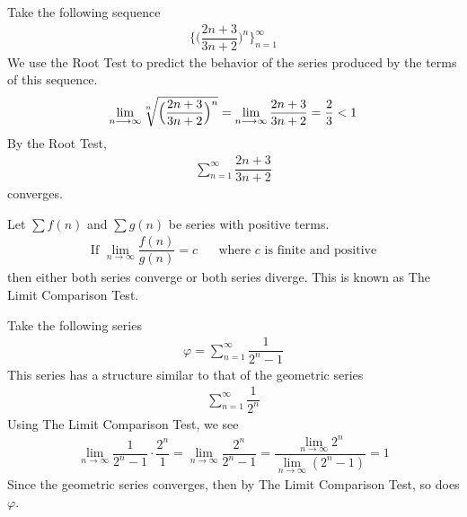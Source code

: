 \begin{example}
Take the following sequence
\begin{align*}
    \Big\{\Big(\dfrac{2n+3}{3n+2}\Big)^{n}\Big\}_{n=1}^{\infty}
\end{align*}
We use the Root Test to predict the behavior of the series produced by the terms of this sequence.
\begin{align*}
    \lim_{n \longrightarrow \infty} \sqrt[\leftroot{2}\uproot{2}n]{\Big(\dfrac{2n+3}{3n+2}\Big)^{n}} = \lim_{n \longrightarrow \infty} \dfrac{2n+3}{3n+2} = \dfrac{2}{3} < 1
\end{align*}
By the Root Test, 
\begin{align*}
\sum_{n=1}^{\infty} \dfrac{2n+3}{3n+2}
\end{align*}
converges.
\end{example}

\begin{theorem}
Let $\sum f(n)$ and $\sum g(n)$ be series with positive terms. 
\begin{align*}
    \text{If} \hspace{4pt} \lim_{n \longrightarrow \infty} \dfrac{f(n)}{g(n)} = c \hspace{20pt} \text{where} \hspace{4pt} c \hspace{4pt} \text{is finite and positive} 
\end{align*}
then either both series converge or both series diverge. This is known as The Limit Comparison Test.
\end{theorem}

\begin{example}
Take the following series
\begin{align*}
    \varphi = \sum_{n = 1}^{\infty} \dfrac{1}{2^{n} - 1}
\end{align*}
This series has a structure similar to that of the geometric series
\begin{align*}
    \sum_{n = 1}^{\infty} \dfrac{1}{2^{n}}
\end{align*}
Using The Limit Comparison Test, we see
\begin{align*}
    \lim_{n \longrightarrow \infty} \dfrac{1}{2^{n} - 1} \cdot \dfrac{2^{n}}{1} = \lim_{n \longrightarrow \infty} \dfrac{2^{n}}{2^{n} - 1} = \dfrac{\lim_{n \longrightarrow \infty} 2^{n}}{\lim_{n \longrightarrow \infty} (2^{n} - 1)} = 1
\end{align*}
Since the geometric series converges, then by The Limit Comparison Test, so does $\varphi$.
\end{example}

